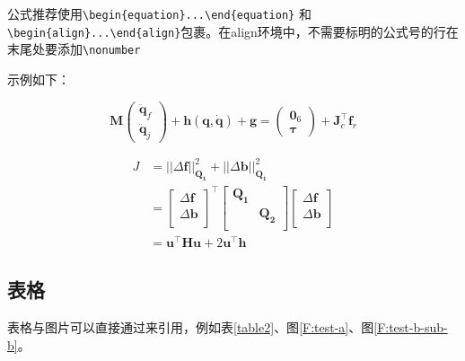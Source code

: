 公式推荐使用\verb|\begin{equation}...\end{equation}|  和\verb|\begin{align}...\end{align}|包裹。在align环境中，不需要标明的公式号的行在末尾处要添加\verb|\nonumber|


示例如下：

\begin{equation}
    \mathbf{M}\begin{pmatrix}\ddot{\mathbf{q}}_f\\\ddot{\mathbf{q}}_j\end{pmatrix}+\mathbf{h}(\mathbf q,\mathbf {\dot q})+\mathbf{g}=\begin{pmatrix}\mathbf{0}_6\\\boldsymbol{\tau}\end{pmatrix}+\boldsymbol{J}_c^\top\mathbf{f}_r
\end{equation}

\begin{align}
    J   & =  ||\Delta \mathbf f||^2_{\mathbf{Q_1}} + ||\Delta \mathbf b||^2_{\mathbf{Q_1}} 
                                \nonumber \\ 
        & =  \begin{bmatrix}
            \Delta \mathbf f \\
            \Delta \mathbf b \\
        \end{bmatrix}^\intercal 
        \begin{bmatrix}
            \mathbf{Q_1} & \\
            & \mathbf{Q_2} \\
        \end{bmatrix}
        \begin{bmatrix}
            \Delta \mathbf f \\
            \Delta \mathbf b \\
        \end{bmatrix} 
                               \nonumber  \\
        & =  \mathbf{u}^\intercal \mathbf H \mathbf{u} + 2\mathbf{u}^\intercal\mathbf h
\end{align}


\subsection{表格}

表格与图片可以直接通过\verbbox{\ref{<key>}}来引用，例如表\ref{table2}、图\ref{F:test-a}、图\ref{F:test-b-sub-b}。

